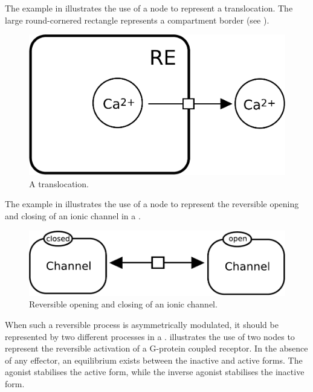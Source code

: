 The example in  illustrates the use of a  node to represent a translocation. The large round-cornered rectangle represents a compartment border (see ).

\begin{figure}[H]
  \centering
  \includegraphics[scale = 0.3]{examples/process-translocation}
  \caption{A translocation.}
  \label{fig:trans-trans}
\end{figure}

The example in  illustrates the use of a  node to represent the reversible opening and closing of an ionic channel in a \PD.

\begin{figure}[H]
  \centering
  \includegraphics[scale = 0.3]{examples/process-reversible}
  \caption{Reversible opening and closing of an ionic channel.}
  \label{fig:trans-reverse}
\end{figure}

When such a reversible process is asymmetrically modulated, it should be represented by two different processes in a \PD.   illustrates the use of two  nodes to represent the reversible activation of a G-protein coupled receptor.  In the absence of any effector, an equilibrium exists between the inactive and active forms.  The agonist stabilises the active form, while the inverse agonist stabilises the inactive form.

